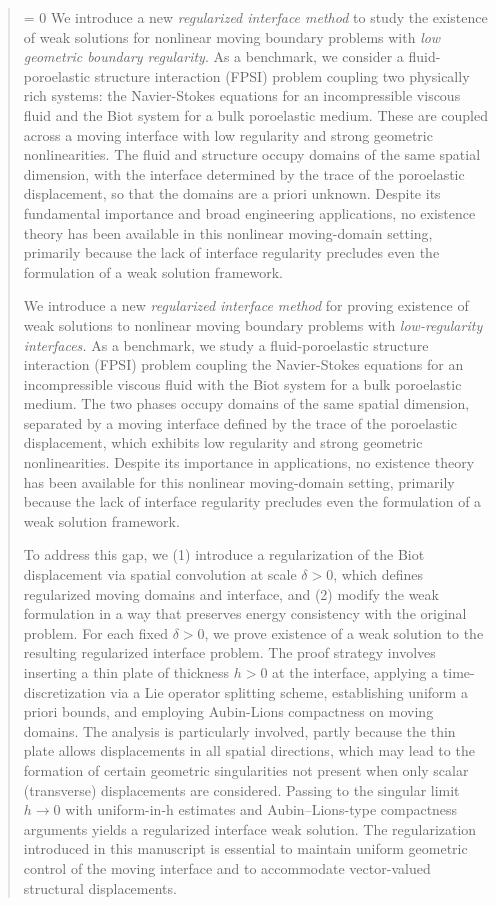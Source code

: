 \documentclass[11pt]{article}
\theoremstyle{definition}
\begin{document}
\begin{abstract}
 = 0
We introduce a new {\emph{regularized interface method}} to study the existence of weak solutions for nonlinear moving boundary problems with {\emph{low geometric boundary regularity}}. As a benchmark, we consider a fluid-poroelastic structure interaction (FPSI) problem coupling two physically rich systems: the Navier-Stokes equations for an incompressible viscous fluid and the Biot system for a bulk poroelastic medium. These are coupled across a moving interface with low regularity and strong geometric nonlinearities. The fluid and structure occupy domains of the same spatial dimension, with the interface determined by the trace of the poroelastic displacement, so that the domains are a priori unknown. Despite its fundamental importance and broad engineering applications, no existence theory has been available in this nonlinear moving-domain setting, primarily because the lack of interface regularity precludes even the formulation of a weak solution framework.
\fi

We introduce a new {\emph{regularized interface method}} for proving existence of weak solutions to nonlinear moving boundary problems with {\emph{low-regularity interfaces.}}
 As a benchmark, we study a fluid-poroelastic structure interaction (FPSI) problem coupling the Navier-Stokes equations for an incompressible viscous fluid with the Biot system for a bulk poroelastic medium. The two phases occupy domains of the same spatial dimension, separated by a moving interface defined by the trace of the poroelastic displacement, which exhibits low regularity and strong geometric nonlinearities. Despite its importance in applications, no existence theory has been available for this nonlinear moving-domain setting, primarily because the lack of interface regularity precludes even the formulation of a weak solution framework.

To address this gap, we (1) introduce a regularization of the Biot displacement via spatial convolution at scale $\delta > 0$, which defines regularized moving domains and interface, and (2) modify the weak formulation in a way that preserves energy consistency with the original problem. For each fixed $\delta > 0$, we prove existence of a weak solution to the resulting regularized interface problem. The proof strategy involves inserting a thin plate of thickness $h > 0$ at the interface, applying a time-discretization via a Lie operator splitting scheme, establishing uniform a priori bounds, and employing Aubin-Lions compactness on moving domains. The analysis is particularly involved, partly because the thin plate allows displacements in all spatial directions, which may lead to the formation of certain geometric singularities not present when only scalar (transverse) displacements are considered. Passing to the singular limit $h \to 0$ with uniform-in-h estimates and Aubin--Lions-type compactness arguments yields a regularized interface weak solution.
The regularization introduced in this manuscript is essential to maintain uniform geometric control of the moving interface and to accommodate vector-valued structural displacements. 


\end{abstract}
\end{document}
